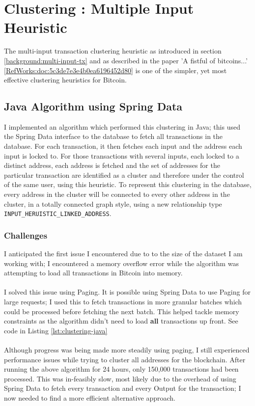\section{Clustering : Multiple Input Heuristic}\label{section-clustering}

The multi-input transaction clustering heuristic as introduced in section \ref{background:multi-input-tx} and as described in the paper 'A fistful of bitcoins...' \ref{RefWorks:doc:5c3de7e3e4b0ea6196452d80} is one of the simpler, yet most effective clustering heuristics for Bitcoin. 

\subsection{Java Algorithm using Spring Data}
I implemented an algorithm which performed this clustering in Java; this used the Spring Data interface to the database to fetch all transactions in the database. For each transaction, it then fetches each input and the address each input is locked to. For those transactions with several inputs, each locked to a distinct address, each address is fetched and the set of addresses for the particular transaction are identified as a cluster and therefore under the control of the same user, using this heuristic. To represent this clustering in the database, every address in the cluster will be connected to every other address in the cluster, in a totally connected graph style, using a new relationship type \texttt{INPUT\_HERUISTIC\_LINKED\_ADDRESS}. 

\subsubsection{Challenges}

I anticipated the first issue I encountered due to to the size of the dataset I am working with; I encountered a memory overflow error while the algorithm was attempting to load all transactions in Bitcoin into memory. 
\\\\
I solved this issue using Paging. It is possible using Spring Data to use Paging for large requests; I used this to fetch transactions in more granular batches which could be processed before fetching the next batch. This helped tackle memory constraints as the algorithm didn't need to load \textbf{all} transactions up front. See code in Listing \ref{lst:clustering-java}
\\\\
Although progress was being made more steadily using paging, I still experienced performance issues while trying to cluster all addresses for the blockchain. After running the above algorithm for 24 hours, only 150,000 transactions had been processed. This was in-feasibly slow, most likely due to the overhead of using Spring Data to fetch every transaction and every Output for the transaction; I now needed to find a more efficient alternative approach. 
\\\\

